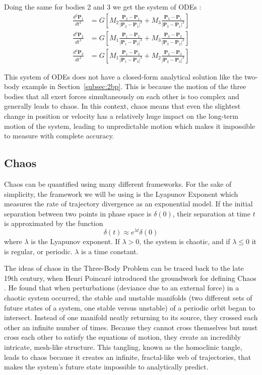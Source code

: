 \documentclass[12pt,a4paper]{article}
\begin{document}
Doing the same for bodies 2 and 3 we get the system of ODEs \citep{murray1999solar}:
\begin{align*}
\frac{d^2\mathbf{P}_1}{dt^2} &= G \left[ M_2 \frac{\mathbf{P}_2 - \mathbf{P}_1}{|\mathbf{P}_2 - \mathbf{P}_1|^3} + M_3 \frac{\mathbf{P}_3 - \mathbf{P}_1}{|\mathbf{P}_3 - \mathbf{P}_1|^3} \right] \\[1em]
\frac{d^2\mathbf{P}_2}{dt^2} &= G \left[ M_1 \frac{\mathbf{P}_1 - \mathbf{P}_2}{|\mathbf{P}_1 - \mathbf{P}_2|^3} + M_3 \frac{\mathbf{P}_3 - \mathbf{P}_2}{|\mathbf{P}_3 - \mathbf{P}_2|^3} \right] \\[1em]
\frac{d^2\mathbf{P}_3}{dt^2} &= G \left[ M_1 \frac{\mathbf{P}_1 - \mathbf{P}_3}{|\mathbf{P}_1 - \mathbf{P}_3|^3} + M_2 \frac{\mathbf{P}_2 - \mathbf{P}_3}{|\mathbf{P}_2 - \mathbf{P}_3|^3} \right]
\end{align*}

This system of ODEs does not have a closed-form analytical solution like the two-body example in Section~\ref{subsec:2bp}. This is because the motion of the three bodies that all exert forces simultaneously on each other is too complex and generally leads to chaos. In this context, chaos means that even the slightest change in position or velocity has a relatively huge impact on the long-term motion of the system, leading to unpredictable motion which makes it impossible to measure with complete accuracy.

\subsection{Chaos}
\label{Chaos}
Chaos can be quantified using many different frameworks. For the sake of simplicity, the framework we will be using is the Lyapunov Exponent \citep{ott2002chaos} which measures the rate of trajectory divergence as an exponential model. If the initial separation between two points in phase space is $\delta(0)$, their separation at time $t$ is approximated by the function
$$\delta(t) \approx e^{\lambda t} \delta(0)$$
where $\lambda$ is the Lyapunov exponent. If $\lambda > 0$, the system is chaotic, and if $\lambda \leq 0$ it is regular, or periodic. $\lambda$ is a time constant.

The ideas of chaos in the Three-Body Problem can be traced back to the late 19th century, when Henri Poincar\'{e} introduced the groundwork for defining Chaos \citep{poincare1890sur}. He found that when perturbations (deviance due to an external force) in a chaotic system occurred, the stable and unstable manifolds (two different sets of future states of a system, one stable versus unstable) of a periodic orbit began to intersect. Instead of one manifold neatly returning to its source, they crossed each other an infinite number of times. Because they cannot cross themselves but must cross each other to satisfy the equations of motion, they create an incredibly intricate, mesh-like structure. This tangling, known as the homoclinic tangle, leads to chaos because it creates an infinite, fractal-like web of trajectories, that makes the system's future state impossible to analytically predict.
\end{document}
